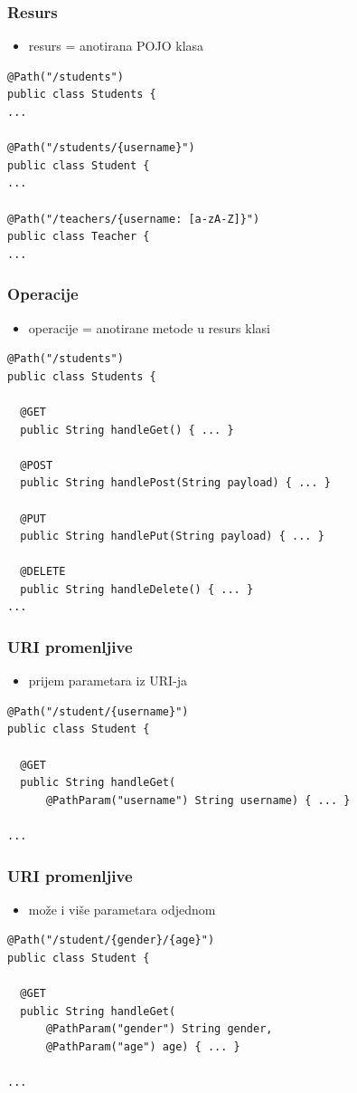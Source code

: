 \documentclass[compress]{beamer}
\begin{document}
\begin{frame}[fragile]
  \frametitle{Resurs}
\begin{itemize}
\item resurs = anotirana POJO klasa
\end{itemize}
\begin{verbatim}
@Path("/students")
public class Students {
...

@Path("/students/{username}")
public class Student {
...

@Path("/teachers/{username: [a-zA-Z]}")
public class Teacher {
...

\end{verbatim}
\end{frame}

\begin{frame}[fragile,shrink=10]
  \frametitle{Operacije}
\begin{itemize}
\item operacije = anotirane metode u resurs klasi
\end{itemize}
\begin{verbatim}
@Path("/students")
public class Students {

  @GET
  public String handleGet() { ... }
  
  @POST
  public String handlePost(String payload) { ... }  
  
  @PUT
  public String handlePut(String payload) { ... }  

  @DELETE
  public String handleDelete() { ... }
...

\end{verbatim}
\end{frame}

\begin{frame}[fragile]
  \frametitle{URI promenljive}
\begin{itemize}
\item prijem parametara iz URI-ja
\end{itemize}
\begin{verbatim}
@Path("/student/{username}")
public class Student {

  @GET
  public String handleGet(
      @PathParam("username") String username) { ... }
  
...

\end{verbatim}
\end{frame}

\begin{frame}[fragile]
  \frametitle{URI promenljive}
\begin{itemize}
\item može i više parametara odjednom
\end{itemize}
\begin{verbatim}
@Path("/student/{gender}/{age}")
public class Student {

  @GET
  public String handleGet(
      @PathParam("gender") String gender,
      @PathParam("age") age) { ... }
  
...

\end{verbatim}
\end{frame}
\end{document}
